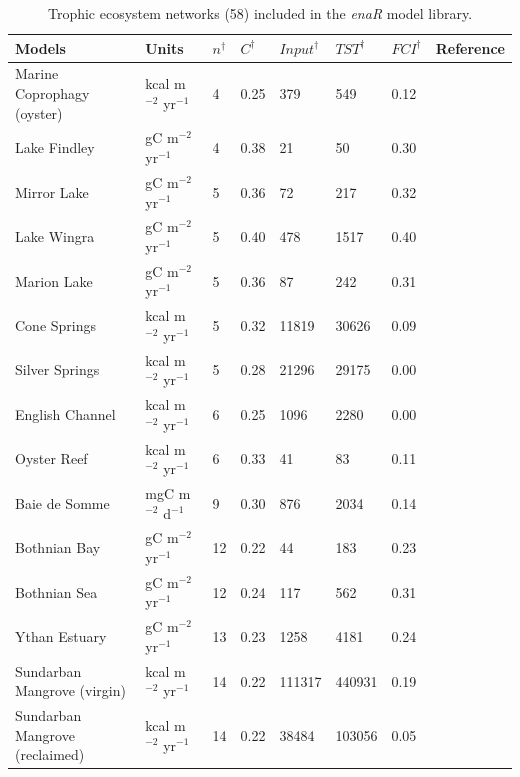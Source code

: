 \documentclass[article]{jss}
\begin{document}
\begin{table}[ht]
\begin{center}
  \caption{Trophic ecosystem networks (58) included in the
    \textit{enaR} model library.} \label{tab:TRO}
  \begin{tiny}
    \begin{tabularx}{\textwidth}{llllllll}
      \hline
      Models & Units & $n^\dagger$ & $C^\dagger$ & $Input^\dagger$ & $TST^\dagger$ & $FCI^\dagger$ & Reference \\
      \hline
      Marine Coprophagy (oyster) & kcal m$^{-2}$ yr$^{-1}$  &   4 & 0.25 & 379 & 549 & 0.12 & \citet{haven66} \\
      Lake Findley  & gC m$^{-2}$ yr$^{-1}$  &   4 & 0.38 &  21 &  50 & 0.30 &  \citet{richey78} \\
      Mirror Lake & gC m$^{-2}$ yr$^{-1}$  &   5 & 0.36 &  72 & 217 & 0.32 &   \citet{richey78} \\
      Lake Wingra & gC m$^{-2}$ yr$^{-1}$  &   5 & 0.40 & 478 & 1517 & 0.40 &  \citet{richey78} \\
      Marion Lake & gC m$^{-2}$ yr$^{-1}$  &   5 & 0.36 &  87 & 242 & 0.31 &  \citet{richey78} \\
      Cone Springs & kcal m$^{-2}$ yr$^{-1}$  &   5 & 0.32 & 11819 & 30626 & 0.09 &  \citet{tilly68} \\
      Silver Springs & kcal m$^{-2}$ yr$^{-1}$  &   5 & 0.28 & 21296 & 29175 & 0.00 &  \citet{odum57} \\
      English Channel & kcal m$^{-2}$ yr$^{-1}$  &   6 & 0.25 & 1096 & 2280 & 0.00 &  \citet{brylinsky72} \\
      Oyster Reef  & kcal m$^{-2}$ yr$^{-1}$  &   6 & 0.33 &  41 &  83 & 0.11 &  \citet{dame81} \\
      Baie de Somme & mgC m$^{-2}$ d$^{-1}$  &   9 & 0.30 & 876 & 2034 & 0.14 &  \citet{rybarczyk03} \\
      Bothnian Bay & gC m$^{-2}$ yr$^{-1}$  &  12 & 0.22 &  44 & 183 & 0.23 &   \citet{sandberg00} \\
      Bothnian Sea & gC m$^{-2}$ yr$^{-1}$  &  12 & 0.24 & 117 & 562 & 0.31 &   \citet{sandberg00} \\
      Ythan Estuary & gC m$^{-2}$ yr$^{-1}$  &  13 & 0.23 & 1258 & 4181 & 0.24 &  \citet{baird81} \\
      Sundarban Mangrove (virgin) & kcal m$^{-2}$ yr$^{-1}$  &  14 & 0.22 & 111317 & 440931 & 0.19 & \citet{ray08} \\
      Sundarban Mangrove (reclaimed) & kcal m$^{-2}$ yr$^{-1}$  &  14 & 0.22 & 38484 & 103056 & 0.05 & \citet{ray08} \\

\end{tabularx}
\end{tiny}
\end{center}
\end{table}
\end{document}

